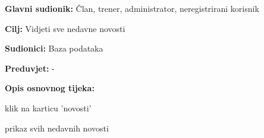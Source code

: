 					\noindent {}
					\begin{packed_item}
	
						\item \textbf{Glavni sudionik: }Član, trener, administrator, neregistrirani korisnik
						\item  \textbf{Cilj: } Vidjeti sve nedavne novosti
						\item  \textbf{Sudionici: } Baza podataka
						\item  \textbf{Preduvjet: } -
						\item  \textbf{Opis osnovnog tijeka:}
						
						\item[] \begin{packed_enum}
	
							\item klik na karticu 'novosti'
							\item prikaz svih nedavnih novosti
							
						\end{packed_enum}
						
					\end{packed_item}
				
					\eject
					
